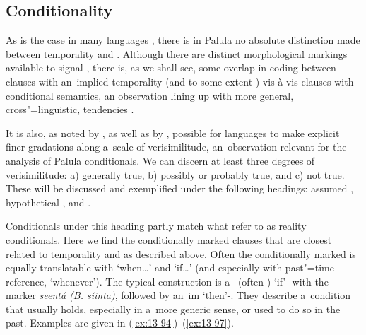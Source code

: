 
\subsection{Conditionality}
\label{subsec:13-4-4}

As is the case in many languages \citep[257--258]{thompsonetal2007}, there is in Palula no absolute distinction made between temporality and . Although there are distinct morphological markings available to signal , there is, as we shall see, some overlap in coding between clauses with an~implied temporality (and to some extent ) vis-à-vis clauses with conditional semantics, an observation lining up with more general, cross"=linguistic, tendencies \citep[161]{cristofaro2005}.



It is also, as noted by \citet[255--260]{thompsonetal2007}, as well as by \citet[333--334]{givon2001b}, possible for languages to make explicit finer gradations along a~scale of verisimilitude, an~observation relevant for the analysis of Palula conditionals. We can discern at least three degrees of verisimilitude: a) generally true, b) possibly or probably true, and c) not true. These will be discussed and exemplified under the following headings: assumed , hypothetical , and .



 Conditionals under this heading partly match what \citet[255--256]{thompsonetal2007} refer to as reality conditionals. Here we find the conditionally marked clauses that are closest related to temporality and  as described above. Often the conditionally marked  is equally translatable with `when{\ldots}' and `if{\ldots}' (and especially with past"=time reference, `whenever'). The typical construction is a~ (often ) `if'- with the  marker \textit{seentá (B. síinta)}, followed by an~im `then'-. They describe a~condition that usually holds, especially in a~more generic sense, or used to do so in the past. Examples are given in (\ref{ex:13-94})--(\ref{ex:13-97}).

